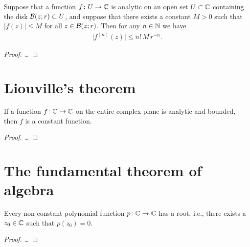 \begin{lemma}
  \label{lem:cauchy_derivative_estimate}
  Suppose that a function $f \colon U \to \bC$ is analytic on an open
  set $U \subset \bC$ containing the disk $\DiskRC{r}{z} \subset U$,
  and suppose that there exists a constant $M>0$ such that
  $|f(z)| \le M$ for all $z \in \DiskRC{r}{z}$.
  Then for any $n \in \bN$ we have
  \begin{align*}
    \big| f^{(n)}(z) \big| \le n! \, M \, r^{-n} .
  \end{align*}
\end{lemma}
\begin{proof}
  \ldots
\end{proof}



\section{Liouville's theorem}

\begin{theorem}
  \label{thm:liouville}
  If a function $f \colon \bC \to \bC$ on the entire complex plane
  is analytic and bounded, then $f$ is a constant function.
\end{theorem}
\begin{proof}
  \ldots
\end{proof}



\section{The fundamental theorem of algebra}

\begin{theorem}
  \label{thm:FUNDAMENTAL_THEOREM_OF_ALGEBRA}
  Every non-constant polynomial function $p \colon \bC \to \bC$
  has a root, i.e., there exists a $z_0 \in \bC$ such that $p(z_0) = 0$.
\end{theorem}
\begin{proof}
  \ldots
\end{proof}

